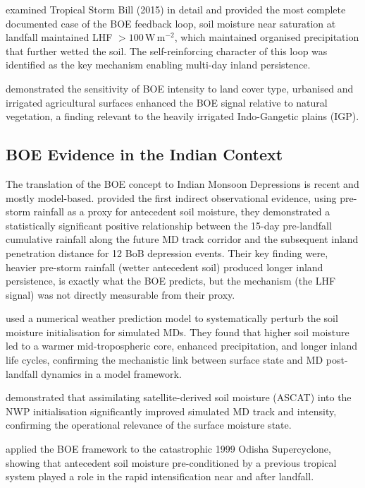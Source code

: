 \autocite{wakefield2021} examined Tropical Storm Bill (2015) in detail
and provided the most complete documented case of the BOE feedback
loop, soil moisture near saturation at landfall maintained LHF
$>100$\,W\,m$^{-2}$, %
which maintained organised precipitation that further wetted the
soil. The self-reinforcing character of this loop was identified as
the key mechanism enabling multi-day inland persistence.

\autocite{nair2019influence} demonstrated the sensitivity of BOE
intensity to land cover type, urbanised and irrigated agricultural
surfaces enhanced the BOE signal relative to natural vegetation, a
finding relevant to the heavily irrigated Indo-Gangetic plains (IGP).

\subsection{BOE Evidence in the Indian Context}
\label{subsec:boe_india}

The translation of the BOE concept to Indian Monsoon Depressions is
recent and mostly model-based. \autocite{kishtawal2013enhancement}
provided the first indirect observational evidence, using pre-storm
rainfall as a proxy for antecedent soil moisture, they demonstrated a
statistically significant positive relationship between the 15-day
pre-landfall cumulative rainfall along the future MD track corridor
and the subsequent inland penetration distance for 12 BoB depression
events. Their key finding were, heavier pre-storm rainfall (wetter
antecedent soil) produced longer inland persistence, is exactly what
the BOE predicts, but the mechanism (the LHF signal) was not directly
measurable from their proxy.

\autocite{hunt2017effect} used a numerical weather prediction model to
systematically perturb the soil moisture initialisation for simulated
MDs. They found that higher soil moisture led to a warmer
mid-tropospheric core, enhanced precipitation, and longer inland life
cycles, confirming the mechanistic link between surface state and MD
post-landfall dynamics in a model framework.

\autocite{osuri2020} demonstrated that assimilating satellite-derived
soil moisture (ASCAT) into the NWP initialisation significantly
improved simulated MD track and intensity, confirming the operational
relevance of the surface moisture state.

\autocite{vijay2024boe} applied the BOE framework to the catastrophic
1999 Odisha Supercyclone, showing that antecedent soil moisture
pre-conditioned by a previous tropical system played a role in the
rapid intensification near and after landfall.

